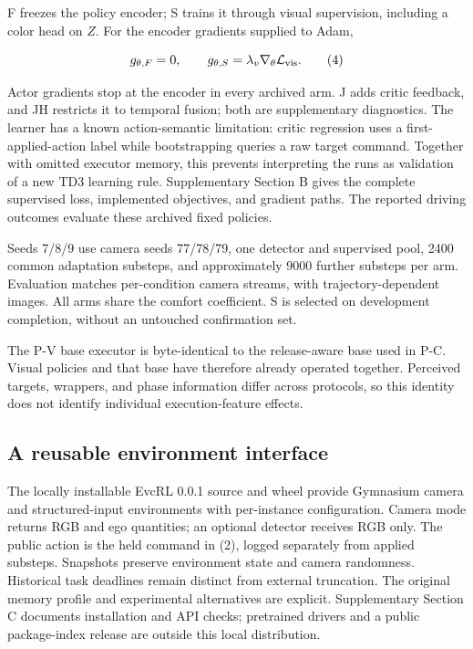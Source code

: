 \documentclass[letterpaper,journal]{IEEEtran}
\begin{document}
F freezes the policy encoder; S trains it through visual supervision, including a color head on \(Z\). For the encoder gradients supplied to Adam,

\[g_{\theta,F}=0,\qquad g_{\theta,S}=\lambda_v\nabla_\theta\mathcal L_{\rm vis}.\tag{4}\]

Actor gradients stop at the encoder in every archived arm. J adds critic feedback, and JH restricts it to temporal fusion; both are supplementary diagnostics. The learner has a known action-semantic limitation: critic regression uses a first-applied-action label while bootstrapping queries a raw target command. Together with omitted executor memory, this prevents interpreting the runs as validation of a new TD3 learning rule. Supplementary Section B gives the complete supervised loss, implemented objectives, and gradient paths. The reported driving outcomes evaluate these archived fixed policies.

Seeds 7/8/9 use camera seeds 77/78/79, one detector and supervised pool, 2400 common adaptation substeps, and approximately 9000 further substeps per arm. Evaluation matches per-condition camera streams, with trajectory-dependent images. All arms share the comfort coefficient. S is selected on development completion, without an untouched confirmation set.

The P-V base executor is byte-identical to the release-aware base used in P-C. Visual policies and that base have therefore already operated together. Perceived targets, wrappers, and phase information differ across protocols, so this identity does not identify individual execution-feature effects.

\subsection{A reusable environment interface}

The locally installable EvcRL 0.0.1 source and wheel provide Gymnasium camera and structured-input environments with per-instance configuration. Camera mode returns RGB and ego quantities; an optional detector receives RGB only. The public action is the held command in (2), logged separately from applied substeps. Snapshots preserve environment state and camera randomness. Historical task deadlines remain distinct from external truncation. The original memory profile and experimental alternatives are explicit. Supplementary Section C documents installation and API checks; pretrained drivers and a public package-index release are outside this local distribution.
\end{document}
